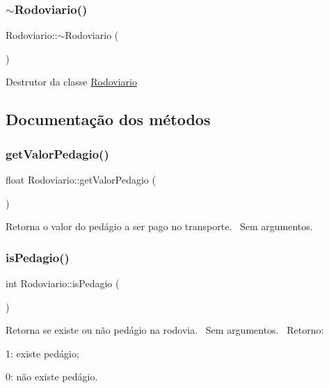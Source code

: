 \subsubsection{\texorpdfstring{$\sim$\+Rodoviario()}{~Rodoviario()}}
{\footnotesize\ttfamily Rodoviario\+::$\sim$\+Rodoviario (\begin{DoxyParamCaption}{ }\end{DoxyParamCaption})}

Destrutor da classe \hyperlink{classRodoviario}{Rodoviario}

\subsection{Documentação dos métodos}
\mbox{\label{classRodoviario_a4c62b1d1a5e924a60b185b2023034943}} 
\subsubsection{\texorpdfstring{get\+Valor\+Pedagio()}{getValorPedagio()}}
{\footnotesize\ttfamily float Rodoviario\+::get\+Valor\+Pedagio (\begin{DoxyParamCaption}{ }\end{DoxyParamCaption})}

Retorna o valor do pedágio a ser pago no transporte.~\newline
Sem argumentos.\mbox{\label{classRodoviario_aa3c5c3b649b9aa4bde43e2154b940c89}} 
\subsubsection{\texorpdfstring{is\+Pedagio()}{isPedagio()}}
{\footnotesize\ttfamily int Rodoviario\+::is\+Pedagio (\begin{DoxyParamCaption}{ }\end{DoxyParamCaption})}

Retorna se existe ou não pedágio na rodovia.~\newline
Sem argumentos.~\newline
Retorno\+:
\begin{DoxyItemize}
\item 1\+: existe pedágio;
\item 0\+: não existe pedágio.
\end{DoxyItemize}\mbox{\label{classRodoviario_a907ec064fb54db8a05b480cf58c5fe57}} 
